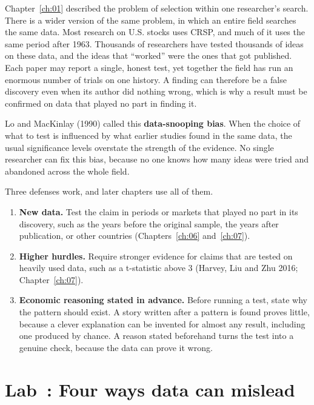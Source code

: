 Chapter~\ref{ch:01} described the problem of selection within one researcher's search. There is a wider version of the same problem, in which an entire field searches the same data. Most research on U.S. stocks uses CRSP, and much of it uses the same period after 1963. Thousands of researchers have tested thousands of ideas on these data, and the ideas that ``worked'' were the ones that got published. Each paper may report a single, honest test, yet together the field has run an enormous number of trials on one history. A finding can therefore be a false discovery even when its author did nothing wrong, which is why a result must be confirmed on data that played no part in finding it.

Lo and MacKinlay (1990) called this \textbf{data-snooping bias}. When the choice of what to test is influenced by what earlier studies found in the same data, the usual significance levels overstate the strength of the evidence. No single researcher can fix this bias, because no one knows how many ideas were tried and abandoned across the whole field.

Three defenses work, and later chapters use all of them.

\begin{enumerate}
  \item \textbf{New data.} Test the claim in periods or markets that played no part in its discovery, such as the years before the original sample, the years after publication, or other countries (Chapters~\ref{ch:06} and~\ref{ch:07}).
  \item \textbf{Higher hurdles.} Require stronger evidence for claims that are tested on heavily used data, such as a t-statistic above 3 (Harvey, Liu and Zhu 2016; Chapter~\ref{ch:07}).
    \item \textbf{Economic reasoning stated in advance.} Before running a test, state why the pattern should exist. A story written after a pattern is found proves little, because a clever explanation can be invented for almost any result, including one produced by chance. A reason stated beforehand turns the test into a genuine check, because the data can prove it wrong. 
\end{enumerate}

\section{Lab~\thechapter: Four ways data can mislead}
\label{sec:02-lab}

